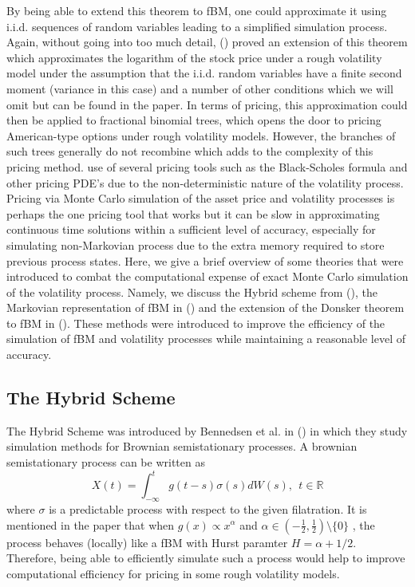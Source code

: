 \documentclass[12pt,oneside]{article}
\begin{document}
By being able to extend this theorem to fBM, one could approximate it using i.i.d. sequences of random variables leading to a simplified simulation process. Again, without going into too much detail, (\cite{HORVATH}) proved an extension of this theorem which approximates the logarithm of the stock price under a rough volatility model under the assumption that the i.i.d. random variables have a finite second moment (variance in this case) and a number of other conditions which we will omit but can be found in the paper. In terms of pricing, this approximation could then be applied to fractional binomial trees, which opens the door to pricing American-type options under rough volatility models. However, the branches of such trees generally do not recombine which adds to the complexity of this pricing method.   
use of several pricing tools such as the Black-Scholes formula and other pricing PDE's due to the non-deterministic nature of the volatility process.  Pricing via Monte Carlo simulation of the asset price and volatility processes is perhaps the one pricing tool that works but it can be slow in approximating continuous time solutions within a sufficient level of accuracy, especially for simulating non-Markovian process due to the extra memory required to store previous process states. Here, we give a brief overview of some theories that were introduced to combat the computational expense of exact Monte Carlo simulation of the volatility process. Namely, we discuss the Hybrid scheme from (\cite{Bennedsen_2017}), the Markovian representation of fBM in (\cite{HARMS}) and the extension of the Donsker theorem to fBM in (\cite{Muruguza_2005}). These methods were introduced to improve the efficiency of the simulation of fBM and volatility processes while maintaining a reasonable level of accuracy.

\subsection{The Hybrid Scheme}
\label{subsec:hybrid}
The Hybrid Scheme was introduced by Bennedsen et al. \cite{Bennedsen_2017} in (\cite{PAPER}) in which they study simulation methods for Brownian semistationary processes. A brownian semistationary process can be written as $$X(t)=\int_{-\infty}^t g(t-s) \sigma(s) dW(s),  \ \  t\in\mathbb{R}$$ 
where $\sigma$ is a predictable process with respect to the given filatration. It is mentioned in the paper that when $g(x) \propto x^\alpha$ and 
$\alpha \in (-\frac{1}{2}, \frac{1}{2}) \setminus \{0\}$
, the process behaves (locally) like a fBM with Hurst paramter $H=\alpha+1/2$.  Therefore, being able to efficiently simulate such a process would help to improve computational efficiency for pricing in some rough volatility models.  
\end{document}

